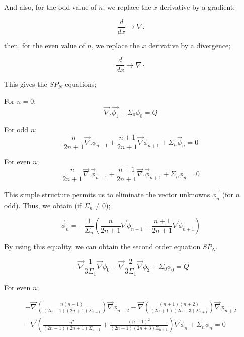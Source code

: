 \documentclass[a4paper, 12pt]{report}
\begin{document}
And also, for the odd value of $n$, we replace the $x$ derivative by a gradient;

\begin{equation}
\frac{d}{dx}\rightarrow \nabla.
\end{equation}

then, for the even value of $n$, we replace the $x$ derivative by a divergence;

\begin{equation}
\frac{d}{dx}\rightarrow \nabla \cdot
\end{equation}

This gives the $SP_N$ equations;

For $n =0$;
\begin{equation}
\vec{\nabla}.\vec{\phi_1} + \Sigma_0 \phi_0 = Q
\end{equation}

For odd $n$;
\begin{equation}
\frac{n}{2n+1} \vec{\nabla}.\phi_{n-1} + \frac{n+1}{2n+1} \vec{\nabla}\phi_{n+1} + \Sigma_n\vec{\phi}_n = 0
\end{equation}

For even $n$;
\begin{equation}
\frac{n}{2n+1} \vec{\nabla}.\vec{\phi}_{n-1} + \frac{n+1}{2n+1} \vec{\nabla}.\vec{\phi}_{n+1} + \Sigma_n\phi_n = 0
\end{equation}

This simple structure permits us to eliminate the vector unknowns $\vec{\phi_n}$ (for $n$ odd).
Thus, we obtain (if $\Sigma_n \neq 0$);

\begin{equation}
\vec{\phi}_n = -\frac{1}{\Sigma_n} \left( \frac{n}{2n+1} \vec{\nabla}\phi_{n-1} + \frac{n+1}{2n+1} \vec{\nabla}\phi_{n+1}   \right)
\end{equation}

By using this equality, we can obtain the second order equation $SP_N$.

\begin{equation}
-\vec{\nabla}\frac{1}{3\Sigma_1}\vec{\nabla} \phi_0 -\vec{\nabla}\frac{2}{3\Sigma_1}\vec{\nabla}\phi_2 + \Sigma_0\phi_0 = Q
\end{equation}

For even $n$;

\begin{multline}
-\vec{\nabla}\left(\frac{n(n-1)}{(2n-1)(2n+1)\Sigma_{n-1}}\right) \vec{\nabla}\phi_{n-2}  -\vec{\nabla}\left(\frac{(n+1)(n+2)}{(2n+1)(2n+3)\Sigma_{n+1}}\right) \vec{\nabla}\phi_{n+2}\\ - \vec{\nabla}\left(\frac{n^2}{(2n-1)(2n+1)\Sigma_{n-1}} + \frac{(n+1)^2}{(2n+1)(2n+3)\Sigma_{n+1}}\right) \vec{\nabla}\phi_{n} + \Sigma_n \phi_n = 0
\end{multline}
\end{document}
